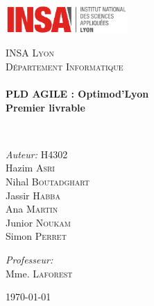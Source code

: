 \begin{titlepage}
\begin{center}

\includegraphics[width=0.35\textwidth]{./logo}~\\[2cm]

\vspace{3cm}

\textsc{\LARGE INSA Lyon}\\[0.5cm]
\textsc{\Large Département Informatique}\\[0.5cm]

\HRule \\[0.4cm]

{\huge \bfseries PLD AGILE : Optimod'Lyon\\
 Premier livrable\\[0.4cm] }

\HRule \\[1.5cm]

\begin{minipage}{0.4\textwidth}
\begin{flushleft} \large
\emph{Auteur:} H4302\\
Hazim \textsc{Asri}\\
Nihal \textsc{Boutadghart}\\
Jassir \textsc{Habba}\\
Ana \textsc{Martin}\\
Junior \textsc{Noukam}\\
Simon \textsc{Perret}\\
\end{flushleft}
\end{minipage}
\begin{minipage}{0.4\textwidth}
\begin{flushright} \large
\emph{Professeur:} \\
Mme. \textsc{Laforest}\\
\end{flushright}
\end{minipage}

\vfill

{\large \today}

\end{center}
\end{titlepage}